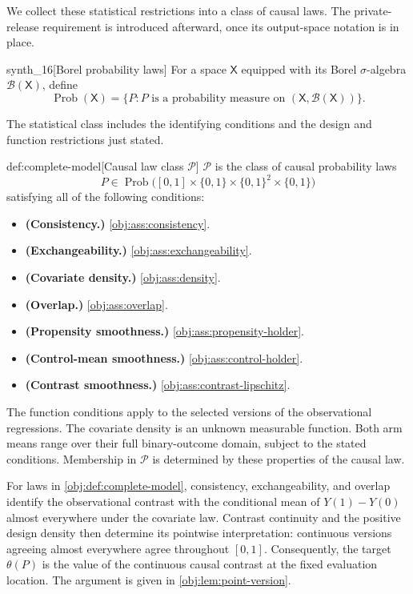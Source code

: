 \documentclass[11pt]{article}
\begin{document}
We collect these statistical restrictions into a class of causal laws. The private-release requirement is introduced afterward, once its output-space notation is in place.

\begin{definitionv}{synth_16}[Borel probability laws]
For a space \(\mathsf X\) equipped with its Borel \(\sigma\)-algebra \(\mathcal B(\mathsf X)\), define
\[
\operatorname{Prob}(\mathsf X)
=
\{P:P\text{ is a probability measure on }(\mathsf X,\mathcal B(\mathsf X))\}.
\]
\end{definitionv}

The statistical class includes the identifying conditions and the design and function restrictions just stated.

\begin{definitionv}{def:complete-model}[Causal law class \(\mathcal P\)]
\(\mathcal P\) is the class of causal probability laws
\[
P\in\operatorname{Prob}
\bigl([0,1]\times\{0,1\}\times\{0,1\}^2\times\{0,1\}\bigr)
\]
satisfying all of the following conditions:
\begin{itemize}
\item \textbf{(Consistency.)} \cref{obj:ass:consistency}.
\item \textbf{(Exchangeability.)} \cref{obj:ass:exchangeability}.
\item \textbf{(Covariate density.)} \cref{obj:ass:density}.
\item \textbf{(Overlap.)} \cref{obj:ass:overlap}.
\item \textbf{(Propensity smoothness.)} \cref{obj:ass:propensity-holder}.
\item \textbf{(Control-mean smoothness.)} \cref{obj:ass:control-holder}.
\item \textbf{(Contrast smoothness.)} \cref{obj:ass:contrast-lipschitz}.
\end{itemize}
The function conditions apply to the selected versions of the observational regressions. The covariate density is an unknown measurable function. Both arm means range over their full binary-outcome domain, subject to the stated conditions. Membership in \(\mathcal P\) is determined by these properties of the causal law.
\end{definitionv}

For laws in \cref{obj:def:complete-model}, consistency, exchangeability, and overlap identify the observational contrast with the conditional mean of \(Y(1)-Y(0)\) almost everywhere under the covariate law. Contrast continuity and the positive design density then determine its pointwise interpretation: continuous versions agreeing almost everywhere agree throughout \([0,1]\). Consequently, the target \(\theta(P)\) is the value of the continuous causal contrast at the fixed evaluation location. The argument is given in \cref{obj:lem:point-version}.
\end{document}
